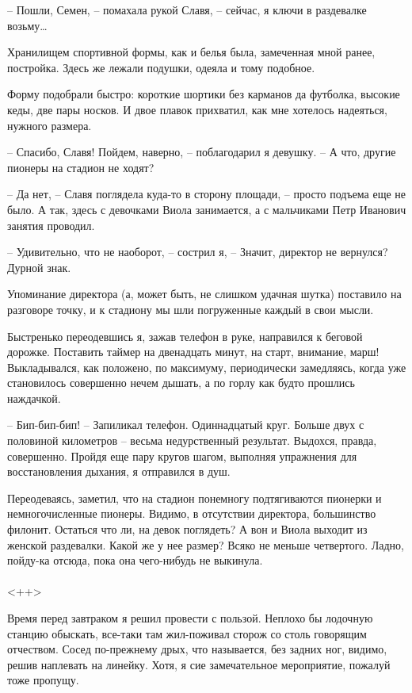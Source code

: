 \documentclass[a4paper]{book}
\begin{document}
-- Пошли, Семен, -- помахала рукой Славя, -- сейчас, я ключи в раздевалке возьму\ldots

Хранилищем спортивной формы, как и белья была, замеченная мной ранее, постройка. Здесь же лежали подушки, одеяла и тому подобное. 

Форму подобрали быстро: короткие шортики без карманов да футболка, высокие кеды, две пары носков. И двое плавок прихватил, как мне хотелось надеяться, нужного размера.

-- Спасибо, Славя! Пойдем, наверно, -- поблагодарил я девушку. -- А что, другие пионеры на стадион не ходят?

-- Да нет, -- Славя поглядела куда-то в сторону площади, -- просто подъема еще не было. А так, здесь с девочками Виола занимается, а с мальчиками Петр Иванович занятия проводил.

-- Удивительно, что не наоборот, -- сострил я, -- Значит, директор не вернулся? Дурной знак. 

Упоминание директора (а, может быть, не слишком удачная шутка) поставило на разговоре точку, и к стадиону мы шли погруженные каждый в свои мысли. 

Быстренько переодевшись я, зажав телефон в руке, направился к беговой дорожке. Поставить таймер на двенадцать минут, на старт, внимание, марш! Выкладывался, как положено, по максимуму, периодически замедляясь, когда уже становилось совершенно нечем дышать, а по горлу как будто прошлись наждачкой.

-- Бип-бип-бип! -- Запиликал телефон. Одиннадцатый круг. Больше двух с половиной километров -- весьма недурственный результат. Выдохся, правда, совершенно. Пройдя еще пару кругов шагом, выполняя упражнения для восстановления дыхания, я отправился в душ. 

Переодеваясь,  заметил, что на стадион понемногу подтягиваются пионерки и немногочисленные пионеры. Видимо, в отсутствии директора, большинство филонит. Остаться что ли, на девок поглядеть? А вон и Виола выходит из женской раздевалки. Какой же у нее размер? Всяко не меньше четвертого. Ладно, пойду-ка отсюда, пока она чего-нибудь не выкинула.

\paragraph{}<++>

Время перед завтраком я решил провести с пользой. Неплохо бы лодочную станцию обыскать, все-таки там жил-поживал сторож со столь говорящим отчеством. Сосед по-прежнему дрых, что называется, без задних ног, видимо, решив наплевать на линейку. Хотя, я сие замечательное мероприятие, пожалуй тоже пропущу. 
\end{document}
